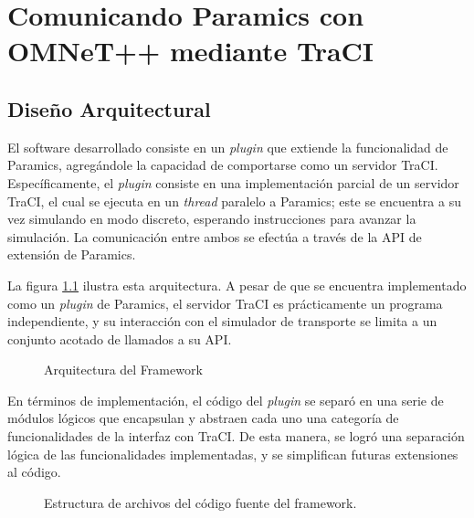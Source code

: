 \chapter{Comunicando Paramics con OMNeT++ mediante TraCI}
\section{Diseño Arquitectural}\label{sec:architecture}

El software desarrollado consiste en un \emph{plugin} que extiende la funcionalidad de Paramics, agregándole la capacidad de comportarse como un servidor TraCI. Específicamente, el \emph{plugin} consiste en una implementación parcial de un servidor TraCI, el cual se ejecuta en un \emph{thread} paralelo a Paramics; este se encuentra a su vez simulando en modo discreto, esperando instrucciones para avanzar la simulación. La comunicación entre ambos se efectúa a través de la API de extensión de Paramics.

La figura \ref{fig:ptraci_arch} ilustra esta arquitectura. A pesar de que se encuentra implementado como un \emph{plugin} de Paramics, el servidor TraCI es prácticamente un programa independiente, y su interacción con el simulador de transporte se limita a un conjunto acotado de llamados a su API.

\begin{figure}[h]
    \centering
    
    \caption{Arquitectura del Framework}
    \label{fig:ptraci_arch}
\end{figure}

En términos de implementación, el código del \emph{plugin} se separó en una serie de módulos lógicos que encapsulan y abstraen cada uno una categoría de funcionalidades de la interfaz con TraCI. De esta manera, se logró una separación lógica de las funcionalidades implementadas, y se simplifican futuras extensiones al código. 

\begin{figure}
    \caption{Estructura de archivos del código fuente del framework.}
    \label{fig:dirtree}
\end{figure}

